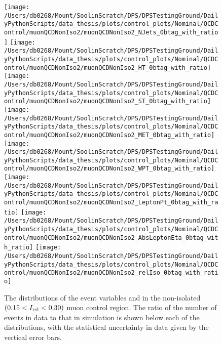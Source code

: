 \begin{figure}[hp]
	\centering
	\texttt{[image: /Users/db0268/Mount/SoolinScratch/DPS/DPSTestingGround/DailyPythonScripts/data\_thesis/plots/control\_plots/Nominal/QCDControl/muonQCDNonIso2/muonQCDNonIso2\_NJets\_0btag\_with\_ratio]}
	\texttt{[image: /Users/db0268/Mount/SoolinScratch/DPS/DPSTestingGround/DailyPythonScripts/data\_thesis/plots/control\_plots/Nominal/QCDControl/muonQCDNonIso2/muonQCDNonIso2\_HT\_0btag\_with\_ratio]}
	\texttt{[image: /Users/db0268/Mount/SoolinScratch/DPS/DPSTestingGround/DailyPythonScripts/data\_thesis/plots/control\_plots/Nominal/QCDControl/muonQCDNonIso2/muonQCDNonIso2\_ST\_0btag\_with\_ratio]} \\
	\texttt{[image: /Users/db0268/Mount/SoolinScratch/DPS/DPSTestingGround/DailyPythonScripts/data\_thesis/plots/control\_plots/Nominal/QCDControl/muonQCDNonIso2/muonQCDNonIso2\_MET\_0btag\_with\_ratio]}
	\texttt{[image: /Users/db0268/Mount/SoolinScratch/DPS/DPSTestingGround/DailyPythonScripts/data\_thesis/plots/control\_plots/Nominal/QCDControl/muonQCDNonIso2/muonQCDNonIso2\_WPT\_0btag\_with\_ratio]} \\
	\texttt{[image: /Users/db0268/Mount/SoolinScratch/DPS/DPSTestingGround/DailyPythonScripts/data\_thesis/plots/control\_plots/Nominal/QCDControl/muonQCDNonIso2/muonQCDNonIso2\_LeptonPt\_0btag\_with\_ratio]} 
	\texttt{[image: /Users/db0268/Mount/SoolinScratch/DPS/DPSTestingGround/DailyPythonScripts/data\_thesis/plots/control\_plots/Nominal/QCDControl/muonQCDNonIso2/muonQCDNonIso2\_AbsLeptonEta\_0btag\_with\_ratio]}
	\texttt{[image: /Users/db0268/Mount/SoolinScratch/DPS/DPSTestingGround/DailyPythonScripts/data\_thesis/plots/control\_plots/Nominal/QCDControl/muonQCDNonIso2/muonQCDNonIso2\_relIso\_0btag\_with\_ratio]}
	\caption[The distributions of the event variables and \Irel{} in the non-isolated $(0.15 < \Irel < 0.30)$ muon control region. The ratio of the number of events in data to that in simulation is shown below each of the distributions, with the statistical uncertainty in data given by the vertical error bars.]{The distributions of the event variables and \Irel{} in the non-isolated $(0.15 < \Irel < 0.30)$ muon control region. The ratio of the number of events in data to that in simulation is shown below each of the distributions, with the statistical uncertainty in data given by the vertical error bars.}
	\label{fig:QCDmuNonIso2}
\end{figure}
